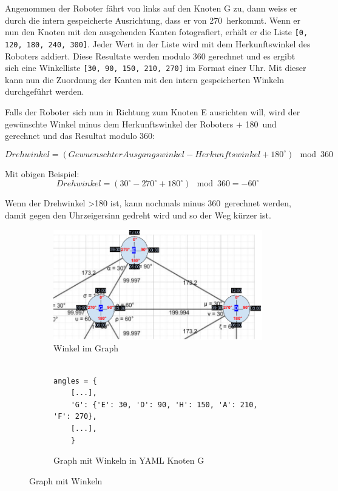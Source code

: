 Angenommen der Roboter fährt von links auf den Knoten G zu, dann weiss er durch die intern gespeicherte Ausrichtung, dass er von 270\textdegree\ herkommt. Wenn er nun den Knoten mit den ausgehenden Kanten fotografiert, erhält er die Liste \verb|[0, 120, 180, 240, 300]|.  Jeder Wert in der Liste wird mit dem Herkunftswinkel des Roboters addiert. Diese Resultate werden modulo 360 gerechnet und es ergibt sich eine Winkelliste \verb|[30, 90, 150, 210, 270]| im Format einer Uhr. Mit dieser kann nun die Zuordnung der Kanten mit den intern gespeicherten Winkeln durchgeführt werden.

Falls der Roboter sich nun in Richtung zum Knoten E ausrichten will, wird der gewünschte Winkel minus dem Herkunftswinkel der Roboters + 180\textdegree\ und gerechnet und das Resultat modulo 360:

\[Drehwinkel = (GewuenschterAusgangswinkel - Herkunftswinkel + 180^\circ) \mod 360\]

Mit obigen Beispiel:
\[Drehwinkel = (30^\circ - 270^\circ + 180^\circ) \mod 360 = -60^\circ\]

Wenn der Drehwinkel >180 ist, kann nochmals minus 360\textdegree\ gerechnet werden, damit gegen den Uhrzeigersinn gedreht wird und so der Weg kürzer ist.


\begin{figure}[H]
\centering
\begin{subfigure}{0.98\textwidth}
\centering
\includegraphics[width=0.95\linewidth]{assets/informatik-prototyp/simulator/internal-angles.png} 
\caption{Winkel im Graph}
\label{fig:labeled-graph-angles}
\end{subfigure}
\begin{subfigure}{0.8\textwidth}
\begin{footnotesize}
\begin{verbatim}

angles = {
    [...],
    'G': {'E': 30, 'D': 90, 'H': 150, 'A': 210, 'F': 270},
    [...],
    }
\end{verbatim}
\end{footnotesize}
\caption{Graph mit Winkeln in YAML Knoten G}
\label{fig:graph-yaml-angle}
\end{subfigure}
\caption{Graph mit Winkeln}
\label{fig:angle-graphs-internal}
\end{figure}

